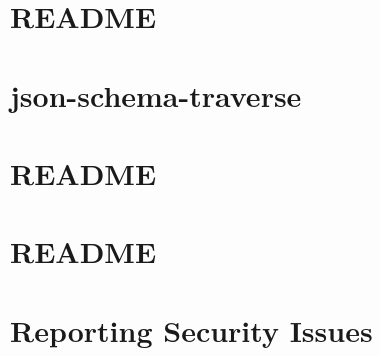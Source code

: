 \documentclass[twoside]{book}
\newcommand{\+}{\discretionary{\mbox{\scriptsize$\hookleftarrow$}}{}{}}
\begin{document}
\chapter{README}
\label{md__c___users_vaishnavi_jadhav__desktop__developer_code_mean_stack_example_client_node_modules_w5ef9de59b8eccf2e54e29a04451b38b4}

\chapter{json-\/schema-\/traverse}
\label{md__c___users_vaishnavi_jadhav__desktop__developer_code_mean_stack_example_client_node_modules_wdd6f6837707a94abc668b0bdf6f7c66e}

\chapter{README}
\label{md__c___users_vaishnavi_jadhav__desktop__developer_code_mean_stack_example_client_node_modules_wd9e92995e2aeae439ecd4cfbada3cd43}

\chapter{README}
\label{md__c___users_vaishnavi_jadhav__desktop__developer_code_mean_stack_example_client_node_modules_webpack__r_e_a_d_m_e}

\chapter{Reporting Security Issues}
\label{md__c___users_vaishnavi_jadhav__desktop__developer_code_mean_stack_example_client_node_modules_webpack__s_e_c_u_r_i_t_y}

\end{document}
